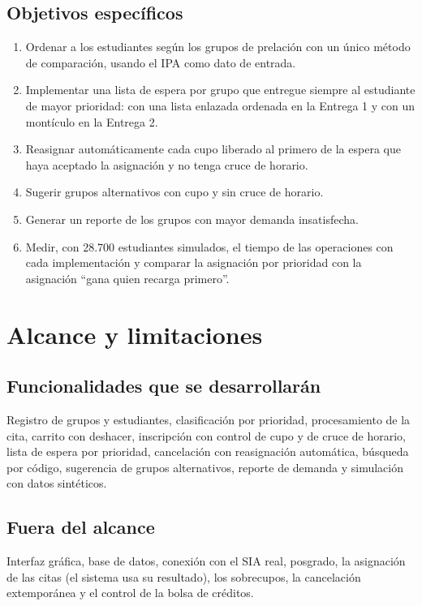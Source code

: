 \documentclass[conference]{IEEEtran}
\begin{document}
\subsection{Objetivos específicos}
\begin{enumerate}
    \item Ordenar a los estudiantes según los grupos de prelación con un único método de comparación, usando el IPA como dato de entrada.
    \item Implementar una lista de espera por grupo que entregue siempre al estudiante de mayor prioridad: con una lista enlazada ordenada en la Entrega 1 y con un montículo en la Entrega 2.
    \item Reasignar automáticamente cada cupo liberado al primero de la espera que haya aceptado la asignación y no tenga cruce de horario.
    \item Sugerir grupos alternativos con cupo y sin cruce de horario.
    \item Generar un reporte de los grupos con mayor demanda insatisfecha.
    \item Medir, con 28.700 estudiantes simulados, el tiempo de las operaciones con cada implementación y comparar la asignación por prioridad con la asignación ``gana quien recarga primero''.
\end{enumerate}


\section{Alcance y limitaciones}

\subsection{Funcionalidades que se desarrollarán}
Registro de grupos y estudiantes, clasificación por prioridad, procesamiento de la cita, carrito con deshacer, inscripción con control de cupo y de cruce de horario, lista de espera por prioridad, cancelación con reasignación automática, búsqueda por código, sugerencia de grupos alternativos, reporte de demanda y simulación con datos sintéticos.

\subsection{Fuera del alcance}
Interfaz gráfica, base de datos, conexión con el SIA real, posgrado, la asignación de las citas (el sistema usa su resultado), los sobrecupos, la cancelación extemporánea y el control de la bolsa de créditos.
\end{document}
